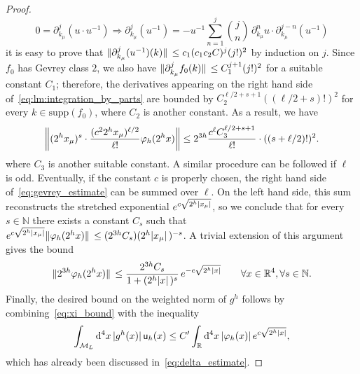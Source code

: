 \documentclass[a4paper, 11pt]{article}
\newcommand{\R}{\mathbb{R}}
\newcommand{\N}{\mathbb{N}}
\newcommand{\sing}[2]{{#1}^{#2}}							%
\renewcommand{\phi}{\varphi}								%
\newcommand{\weight}{\mathsf{u}}							%
\theoremstyle{thm}
\begin{document}
\begin{proof}
\begin{equation}
0 = \partial^j_{k_\mu} (u \cdot u^{-1}) \Rightarrow \partial^j_{k_\mu} (u^{-1}) = - u^{-1} \sum_{n = 1}^j \binom{j}{n} \, \partial^n_{k_\mu} u \cdot \partial^{j - n}_{k_\mu} (u^{-1})
\end{equation}
it is easy to prove that $\norm*{\partial^j_{k_\mu} (u^{-1})(k)} \le c_1 (c_1 c_2 C)^j (j!)^2$ by induction on $j$. Since $f_0$ has Gevrey class $2$, we also have $\norm*{\partial^j_{k_\mu} f_0(k)} \le C_1^{j+1} (j!)^2$ for a suitable constant $C_1$; therefore, the derivatives appearing on the right hand side of~\eqref{eq:lm:integration_by_parts} are bounded by $C_2^{\ell/2 + s + 1} ((\ell/2+s)!)^2$ for every $k \in \mathrm{supp}(f_0)$, where $C_2$ is another constant. As a result, we have
\begin{equation}
\label{eq:gevrey_estimate}
\norm{(2^h x_\mu)^s \cdot \frac{(c^2 2^h x_\mu)^{\ell/2}}{\ell!} \phi_h(2^h x)} \le  2^{3h} \frac{c^\ell C_3^{\ell/2 + s + 1}}{\ell!} \cdot ((s + \ell/2)!)^2.
\end{equation} 
where $C_3$ is another suitable constant. A similar procedure can be followed if $\ell$ is odd. Eventually, if the constant $c$ is properly chosen, the right hand side of~\eqref{eq:gevrey_estimate} can be summed over $\ell$. On the left hand side, this sum reconstructs the stretched exponential $e^{c \sqrt{2^h \abs*{x_\mu}}}$, so we conclude that for every $s \in \N$ there exists a constant $C_s$ such that $e^{c \sqrt{2^h \abs*{x_\mu}}}\norm*{\phi_h(2^h x)} \le (2^{3h} C_s)(2^h \abs*{x_\mu})^{-s}$. A trivial extension of this argument gives the bound
\begin{equation}
\label{eq:xi_bound}
\norm*{2^{3h} \phi_h(2^h x)} \le \frac{2^{3h} C_s}{1 + (2^h \abs*{x})^s} \, e^{-c \sqrt{2^h \abs*{x}}} \qquad \forall x \in \R^4, \forall s \in \N.
\end{equation}
Finally, the desired bound on the weighted norm of $\sing{g}{h}$ follows by combining~\eqref{eq:xi_bound} with the inequality
\begin{equation}
\label{eq:L1_bound}
\int_{\mathcal{M}_L} \dd[4]{x} \abs*{\sing{g}{h}(x)} \weight_h(x) \le C' \int_\R \dd[4]{x} \abs{\phi_h(x)} \, e^{c\sqrt{2^h \abs{x}}},
\end{equation}
which has already been discussed in~\eqref{eq:delta_estimate}.


\end{proof}
\end{document}
